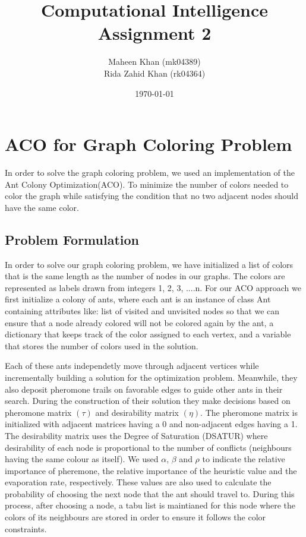 \documentclass[a4paper]{article}
\begin{document}
\newcommand{\shellcmd}[1]{\\\indent\indent\texttt{\footnotesize\# #1}\\}

\title{Computational Intelligence \\ Assignment 2}
\author{Maheen Khan (mk04389) \\ Rida Zahid Khan (rk04364)}
\date{\today}
\maketitle
\section{ACO for Graph Coloring Problem}
\par In order to solve the graph coloring problem, we used an implementation of the Ant Colony Optimization(ACO).
To minimize the number of colors needed to color the graph while satisfying the condition that no two adjacent nodes should have the same color.
\subsection{Problem Formulation}
In order to solve our graph coloring problem, we have initialized a list of colors that is the same length as the number of nodes in our graphs.
The colors are represented as labels drawn from integers 1, 2, 3, ....n. For our ACO approach we first initialize a colony of ants, where each ant is an instance of class Ant containing attributes like:
list of visited and unvisited nodes so that we can ensure that a node already colored will not be colored again by the ant, a dictionary that keeps track of the color assigned to each vertex, and a variable that stores the number of colors used in the solution. 
\par Each of these ants independetly move through adjacent vertices while incrementally building a solution for the optimization problem. Meanwhile, they also deposit pheromone trails on favorable edges 
to guide other ants in their search. 
During the construction of their solution they make decisions based on pheromone matrix $(\tau)$ and desirability matrix $(\eta)$. The pheromone matrix is initialized with adjacent matrices having a 0 and non-adjacent edges having a 1. The desirability matrix uses the Degree of Saturation (DSATUR) where desirability of each node is proportional to the number of conflicts (neighbours having the same colour as itself).
We used $\alpha$, $\beta$ and $\rho$ to indicate the relative importance of pheremone, the relative importance of the heuristic value and the evaporation rate, respectively. 
These values are also used to calculate the probability of choosing the next node that the ant should travel to. During this process, after choosing a node, a tabu list is maintianed for this node where the colors of its neighbours are stored in order to ensure it follows the color constraints.
\end{document}
